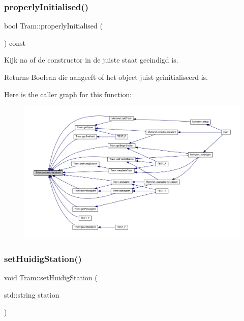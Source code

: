 \subsubsection{\texorpdfstring{properly\+Initialised()}{properlyInitialised()}}
{\footnotesize\ttfamily bool Tram\+::properly\+Initialised (\begin{DoxyParamCaption}{ }\end{DoxyParamCaption}) const}



Kijk na of de constructor in de juiste staat geeindigd is. 

\begin{DoxyReturn}{Returns}
Boolean die aangeeft of het object juist geinitialiseerd is. 
\end{DoxyReturn}
Here is the caller graph for this function\+:\nopagebreak
\begin{figure}[H]
\begin{center}
\leavevmode
\includegraphics[width=350pt]{class_tram_ac2688f590e4db232b4f535c9bf959efb_icgraph}
\end{center}
\end{figure}
\mbox{\label{class_tram_ad8627700455e2d24563e08a72d887197}} 
\subsubsection{\texorpdfstring{set\+Huidig\+Station()}{setHuidigStation()}}
{\footnotesize\ttfamily void Tram\+::set\+Huidig\+Station (\begin{DoxyParamCaption}\item[{std\+::string}]{station }\end{DoxyParamCaption})}



